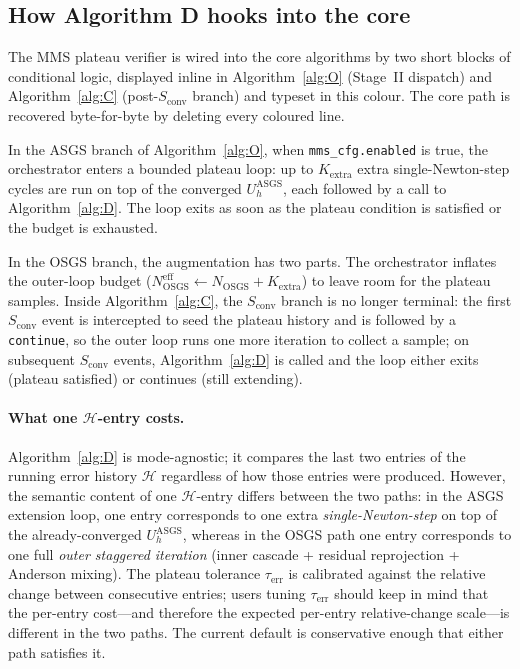 \documentclass{article}
\newcommand{\code}[1]{\texttt{\small #1}}
\newcommand{\extline}[1]{{\color{extcolor}#1}}
\begin{document}
\subsection{How Algorithm D hooks into the core}
\label{sec:mms-hooks}

\extline{The MMS plateau verifier is wired into the core algorithms by
two short blocks of conditional logic, displayed inline in
Algorithm~\ref{alg:O} (Stage~II dispatch) and Algorithm~\ref{alg:C}
(post-$S_{\mathrm{conv}}$ branch) and typeset in this colour. The
core path is recovered byte-for-byte by deleting every coloured line.}

\extline{In the ASGS branch of Algorithm~\ref{alg:O}, when
\code{mms\_cfg.enabled} is true, the orchestrator enters a bounded
plateau loop: up to $K_{\mathrm{extra}}$ extra single-Newton-step cycles
are run on top of the converged $U_h^{\mathrm{ASGS}}$, each followed
by a call to Algorithm~\ref{alg:D}. The loop exits as soon as the
plateau condition is satisfied or the budget is exhausted.}

\extline{In the OSGS branch, the augmentation has two parts.
The orchestrator inflates the outer-loop budget
($N_{\mathrm{OSGS}}^{\mathrm{eff}} \gets N_{\mathrm{OSGS}} + K_{\mathrm{extra}}$)
to leave room for the plateau samples. Inside Algorithm~\ref{alg:C},
the $S_{\mathrm{conv}}$ branch is no longer terminal: the first
$S_{\mathrm{conv}}$ event is intercepted to seed the plateau history
and is followed by a \texttt{continue}, so the outer loop runs one
more iteration to collect a sample; on subsequent $S_{\mathrm{conv}}$
events, Algorithm~\ref{alg:D} is called and the loop either exits
(plateau satisfied) or continues (still extending).}

\extline{\paragraph{What one $\mathcal{H}$-entry costs.}
Algorithm~\ref{alg:D} is mode-agnostic; it compares the last two
entries of the running error history $\mathcal{H}$ regardless of how
those entries were produced. However, the semantic content of one
$\mathcal{H}$-entry differs between the two paths:
in the ASGS extension loop, one entry corresponds to one extra
\emph{single-Newton-step} on top of the already-converged
$U_h^{\mathrm{ASGS}}$, whereas in the OSGS path one entry
corresponds to one full \emph{outer staggered iteration} (inner
cascade + residual reprojection + Anderson mixing). The plateau
tolerance $\tau_{\mathrm{err}}$ is calibrated against the relative
change between consecutive entries; users tuning $\tau_{\mathrm{err}}$
should keep in mind that the per-entry cost---and therefore the
expected per-entry relative-change scale---is different in the two
paths. The current default is conservative enough that either path
satisfies it.}
\end{document}
